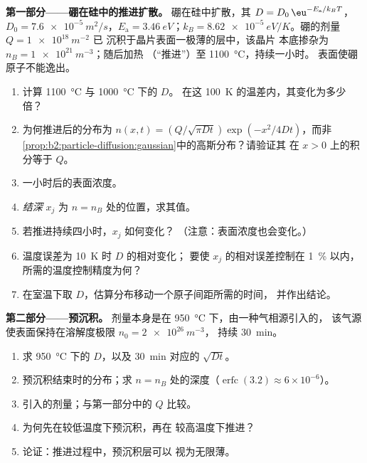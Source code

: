 \begin{problem}\label{pb:b2:particle-diffusion:1}
\textbf{第一部分——硼在硅中的推进扩散。}
硼在硅中扩散，其 $D = D_0\,\eu^{-E_{\text{a}}/k_BT}$，$D_0 =
\qty{7.6e-5}{m^2/s}$，$E_{\text{a}} = \qty{3.46}{eV}$；$k_B =
\qty{8.62e-5}{eV/K}$。硼的剂量 $Q = \qty{1e18}{m^{-2}}$ 已
沉积于晶片表面一极薄的层中，该晶片
本底掺杂为 $n_B = \qty{1e21}{m^{-3}}$；随后加热
（“推进”）至 \qty{1100}{\celsius}，持续一小时。
表面使硼原子不能逸出。
\begin{enumerate}
  \item 计算 \qty{1100}{\celsius} 与 \qty{1000}{\celsius} 下的 $D$。
        在这 \qty{100}{K} 的温差内，其变化为多少倍？
  \item 为何推进后的分布为 $n(x,t) = (Q/\sqrt{\pi
        Dt})\exp(-x^2/4Dt)$，而非
        \cref{prop:b2:particle-diffusion:gaussian}中的高斯分布？请验证其
        在 $x > 0$ 上的积分等于 $Q$。
  \item 一小时后的表面浓度。
  \item \emph{结深} $x_j$ 为 $n = n_B$ 处的位置，求其值。
  \item 若推进持续四小时，$x_j$ 如何变化？
        （注意：表面浓度也会变化。）
  \item 温度误差为 \qty{10}{K} 时 $D$ 的相对变化；
        要使 $x_j$ 的相对误差控制在 \qty{1}{\%} 以内，所需的温度控制精度为何？
  \item 在室温下取 $D$，估算分布移动一个原子间距所需的时间，
        并作出结论。
\end{enumerate}

\textbf{第二部分——预沉积。}
剂量本身是在 \qty{950}{\celsius} 下，由一种气相源引入的，
该气源使表面保持在溶解度极限 $n_0 = \qty{2e26}{m^{-3}}$，
持续 \qty{30}{min}。
\begin{enumerate}[resume]
  \item 求 \qty{950}{\celsius} 下的 $D$，以及 \qty{30}{min} 对应的 $\sqrt{Dt}$。
  \item 预沉积结束时的分布；求 $n =
        n_B$ 处的深度（$\operatorname{erfc}(3.2) \approx 6 \times 10^{-6}$）。
  \item 引入的剂量；与第一部分中的 $Q$ 比较。
  \item 为何先在较低温度下预沉积，再在
        较高温度下推进？
  \item 论证：推进过程中，预沉积层可以
        视为无限薄。
\end{enumerate}


\end{problem}
